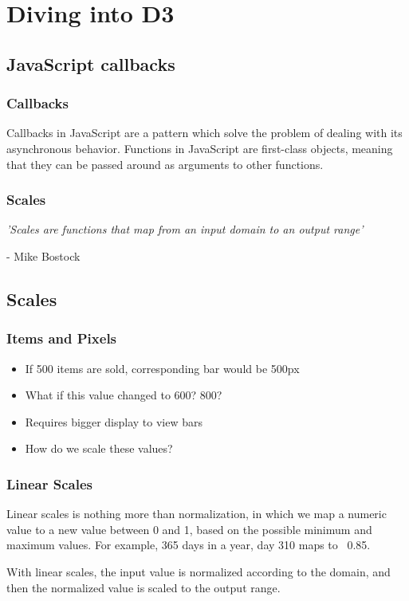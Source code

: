 \documentclass[red]{beamer}
\begin{document}
\section[Outline]{}

\section{Diving into D3}

\subsection{JavaScript callbacks}
\begin{frame}
  \frametitle{Callbacks}
  Callbacks in JavaScript are a pattern which solve the problem of dealing with its asynchronous behavior. Functions in JavaScript are first-class objects, meaning that they can be passed around as arguments to other functions. 
  \newline
  
  \lstcallback
\end{frame}

\begin{frame}
    \frametitle{Scales}
    \textit{'Scales are functions that map from an input domain to an output range'}
    \newline

    \hspace{5.9cm} - Mike Bostock 
\end{frame}


\subsection{Scales}

\begin{frame}
  \frametitle{Items and Pixels}   %
  \lstl

  \begin{itemize}
  \item<1-> If 500 items are sold, corresponding bar would be 500px
  \item<2-> What if this value changed to 600? 800?
  \item<3-> Requires bigger display to view bars
  \item<4-> How do we scale these values?
  \end{itemize}
\end{frame}

\begin{frame}
  \frametitle{Linear Scales}
  Linear scales is nothing more than normalization, in which we map a numeric value to a 
  new value between 0 and 1, based on the possible minimum and maximum values. For example, 
  365 days in a year, day 310 maps to ~0.85. 
  \newline

  With linear scales, the input value is normalized according to the domain, and then the 
  normalized value is scaled to the output range. 
\end{frame}
\end{document}
